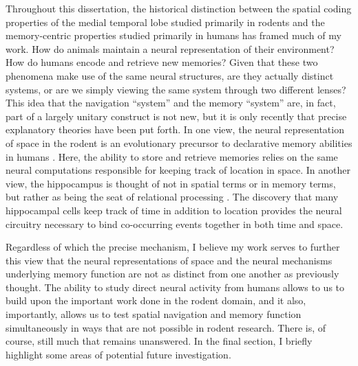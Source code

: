 Throughout this dissertation, the historical distinction between the spatial coding properties of the medial temporal lobe studied primarily in rodents and the memory-centric properties studied primarily in humans has framed much of my work. How do animals maintain a neural representation of their environment? How do humans encode and retrieve new memories? Given that these two phenomena make use of the same neural structures, are they actually distinct systems, or are we simply viewing the same system through two different lenses? This idea that the navigation ``system'' and the memory ``system'' are, in fact, part of a largely unitary construct is not new, but it is only recently that precise explanatory theories have been put forth. In one view, the neural representation of space in the rodent is an evolutionary precursor to declarative memory abilities in humans \citep{BuzsMose13}. Here, the ability to store and retrieve memories relies on the same neural computations responsible for keeping track of location in space. In another view, the hippocampus is thought of not in spatial terms or in memory terms, but rather as being the seat of relational processing \citep{CoheEich93,Eich14}. The discovery that many hippocampal cells keep track of time in addition to location \citep{MacDEtal11,PastEtal08} provides the neural circuitry necessary to bind co-occurring events together in both time and space.

Regardless of which the precise mechanism, I believe my work serves to further this view that the neural representations of space and the neural mechanisms underlying memory function are not as distinct from one another as previously thought. The ability to study direct neural activity from humans allows to us to build upon the important work done in the rodent domain, and it also, importantly, allows us to test spatial navigation and memory function simultaneously in ways that are not possible in rodent research. There is, of course, still much that remains unanswered. In the final section, I briefly highlight some areas of potential future investigation.













